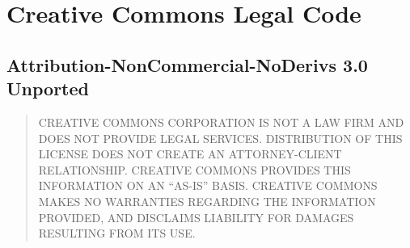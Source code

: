 \section{Creative Commons Legal Code}

\subsection{Attribution-NonCommercial-NoDerivs 3.0 Unported}





\begin{quotation}
CREATIVE COMMONS CORPORATION IS NOT A LAW FIRM AND DOES
NOT PROVIDE LEGAL SERVICES. DISTRIBUTION OF THIS LICENSE
DOES NOT CREATE AN ATTORNEY-CLIENT RELATIONSHIP. CREATIVE
COMMONS PROVIDES THIS INFORMATION ON AN ``AS-IS'' BASIS.
CREATIVE COMMONS MAKES NO WARRANTIES REGARDING THE
INFORMATION PROVIDED, AND DISCLAIMS LIABILITY FOR DAMAGES
RESULTING FROM ITS USE.
\end{quotation}
